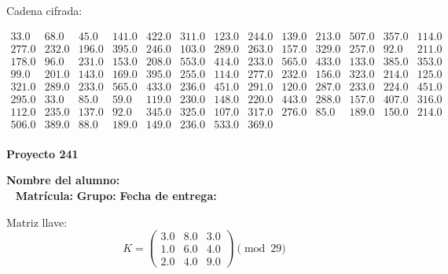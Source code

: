 \documentclass[12pt]{article}
\begin{document}
Cadena cifrada:
\begin{center}
$\begin{array}{lllllllllllll}
33.0 & 68.0 & 45.0 & 141.0 & 422.0 & 311.0 & 123.0 & 244.0 & 139.0 & 213.0 & 507.0 & 357.0 & 114.0\\
277.0 & 232.0 & 196.0 & 395.0 & 246.0 & 103.0 & 289.0 & 263.0 & 157.0 & 329.0 & 257.0 & 92.0 & 211.0\\
178.0 & 96.0 & 231.0 & 153.0 & 208.0 & 553.0 & 414.0 & 233.0 & 565.0 & 433.0 & 133.0 & 385.0 & 353.0\\
99.0 & 201.0 & 143.0 & 169.0 & 395.0 & 255.0 & 114.0 & 277.0 & 232.0 & 156.0 & 323.0 & 214.0 & 125.0\\
321.0 & 289.0 & 233.0 & 565.0 & 433.0 & 236.0 & 451.0 & 291.0 & 120.0 & 287.0 & 233.0 & 224.0 & 451.0\\
295.0 & 33.0 & 85.0 & 59.0 & 119.0 & 230.0 & 148.0 & 220.0 & 443.0 & 288.0 & 157.0 & 407.0 & 316.0\\
112.0 & 235.0 & 137.0 & 92.0 & 345.0 & 325.0 & 107.0 & 317.0 & 276.0 & 85.0 & 189.0 & 150.0 & 214.0\\
506.0 & 389.0 & 88.0 & 189.0 & 149.0 & 236.0 & 533.0 & 369.0\\
\end{array}$
\end{center}

\newpage


\textbf{Proyecto 241}

\textbf{Nombre del alumno:} \underline{\hspace{13cm}}\\\
\vspace{1cm}
\textbf{Matrícula:} \underline{\hspace{4cm}} \hspace{1cm}
\textbf{Grupo:} \underline{\hspace{2cm}}
\textbf{Fecha de entrega:} \underline{\hspace{2cm}}

\medskip

Matriz llave:
\[
K = \begin{pmatrix}
3.0 & 8.0 & 3.0\\
1.0 & 6.0 & 4.0\\
2.0 & 4.0 & 9.0
\end{pmatrix} \pmod{29}
\]
\end{document}
